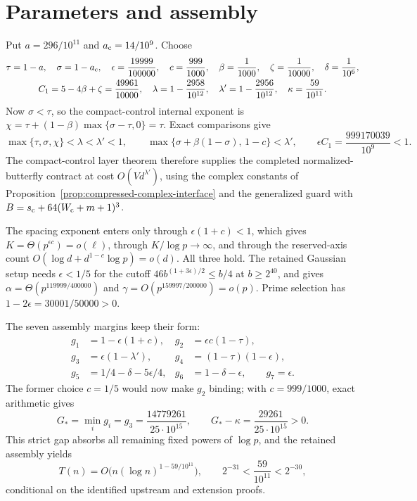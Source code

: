 \documentclass[11pt]{article}
\begin{document}
\section{Parameters and assembly}
Put $a=296/10^{11}$ and $a_{\rm c}=14/10^9$. Choose
\begin{gather*}
 \tau=1-a,\quad\sigma=1-a_{\rm c},\quad
 \epsilon=\frac{19999}{100000},\quad c=\frac{999}{1000},\quad
 \beta=\frac1{1000},\quad\zeta=\frac1{10000},\quad\delta=\frac1{10^6},\\
 C_1=5-4\beta+\zeta=\frac{49961}{10000},\quad
 \lambda=1-\frac{2958}{10^{12}},\quad
 \lambda'=1-\frac{2956}{10^{12}},\quad
 \kappa=\frac{59}{10^{11}}.
\end{gather*}
Now $\sigma<\tau$, so the compact-control internal exponent is
$\chi=\tau+(1-\beta)\max\{\sigma-\tau,0\}=\tau$. Exact comparisons give
\[
 \max\{\tau,\sigma,\chi\}<\lambda<\lambda'<1,\qquad
 \max\{\sigma+\beta(1-\sigma),\,1-c\}<\lambda',\qquad
 \epsilon C_1=\frac{999170039}{10^9}<1.
\]
The compact-control layer theorem therefore supplies the completed
normalized-butterfly contract at cost $O(Vd^{\lambda'})$, using the complex
constants of Proposition~\ref{prop:compressed-complex-interface} and the
generalized guard with $B=s_{\rm c}+64(W_{\rm c}+m+1)^3$.

The spacing exponent enters only through $\epsilon(1+c)<1$, which gives
$K=\Theta(p^{\epsilon c})=o(\ell)$, through $K/\log p\to\infty$, and through
the reserved-axis count $O(\log d+d^{1-c}\log p)=o(d)$. All three hold. The
retained Gaussian setup needs $\epsilon<1/5$ for the cutoff
$46b^{(1+3\epsilon)/2}\le b/4$ at $b\ge2^{40}$, and gives
$\alpha=\Theta(p^{119999/400000})$ and $\gamma=O(p^{159997/200000})=o(p)$.
Prime selection has $1-2\epsilon=30001/50000>0$.

The seven assembly margins keep their form:
\begin{align*}
 g_1&=1-\epsilon(1+c),&g_2&=\epsilon c(1-\tau),\\
 g_3&=\epsilon(1-\lambda'),&g_4&=(1-\tau)(1-\epsilon),\\
 g_5&=1/4-\delta-5\epsilon/4,&g_6&=1-\delta-\epsilon,\qquad g_7=\epsilon.
\end{align*}
The former choice $c=1/5$ would now make $g_2$ binding; with $c=999/1000$,
exact arithmetic gives
\[
 G_*=\min_ig_i=g_3=\frac{14779261}{25\cdot10^{15}},\qquad
 G_*-\kappa=\frac{29261}{25\cdot10^{15}}>0.
\]
This strict gap absorbs all remaining fixed powers of $\log p$, and the
retained assembly yields
\[
 T(n)=O\bigl(n(\log n)^{1-59/10^{11}}\bigr),\qquad
 2^{-31}<\frac{59}{10^{11}}<2^{-30},
\]
conditional on the identified upstream and extension proofs.
\end{document}
